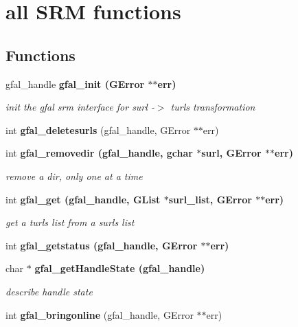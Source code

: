 \section{all SRM functions}
\label{group__srm__group}
\subsection*{Functions}
\begin{CompactItemize}
\item 
gfal\_\-handle \bf{gfal\_\-init} (GError $\ast$$\ast$err)\label{group__srm__group_g0cdadb4ebbaac57afd72c2369f8ac2ef}

\begin{CompactList}\small\item\em init the gfal srm interface for surl -$>$ turls transformation \item\end{CompactList}\item 
int \textbf{gfal\_\-deletesurls} (gfal\_\-handle, GError $\ast$$\ast$err)\label{group__srm__group_gb0a2e0313f2418614690d624166ad8c0}

\item 
int \bf{gfal\_\-removedir} (gfal\_\-handle, gchar $\ast$surl, GError $\ast$$\ast$err)\label{group__srm__group_g5c1b039985488235931ecea769bc7fb1}

\begin{CompactList}\small\item\em remove a dir, only one at a time \item\end{CompactList}\item 
int \bf{gfal\_\-get} (gfal\_\-handle, GList $\ast$surl\_\-list, GError $\ast$$\ast$err)
\begin{CompactList}\small\item\em get a turls list from a surls list \item\end{CompactList}\item 
int \bf{gfal\_\-getstatus} (gfal\_\-handle, GError $\ast$$\ast$err)
\item 
char $\ast$ \bf{gfal\_\-get\-Handle\-State} (gfal\_\-handle)
\begin{CompactList}\small\item\em describe handle state \item\end{CompactList}\item 
int \textbf{gfal\_\-bringonline} (gfal\_\-handle, GError $\ast$$\ast$err)\label{group__srm__group_g8df147aadc31a312b25c40fc9a3df77f}


\end{CompactItemize}
